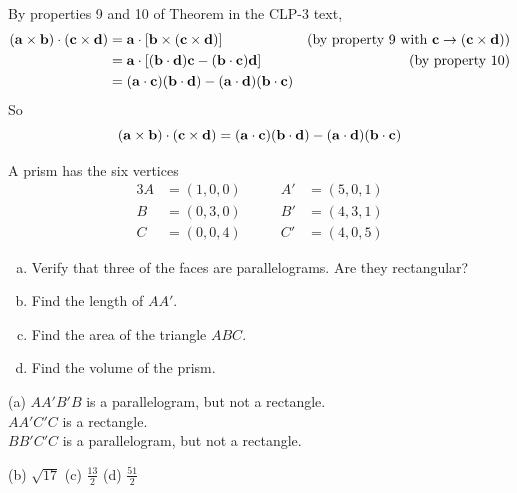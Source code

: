\begin{solution}
By properties 9 and 10 of Theorem  in the CLP-3 
text,
\begin{align*}
(\mathbf{a}\times\mathbf{b})\cdot(\mathbf{c}\times\mathbf{d})
&=\mathbf{a}\cdot[\mathbf{b}\times(\mathbf{c}\times\mathbf{d})]
\hskip.5in&\text{(by property 9 with $\mathbf{c}\rightarrow (\mathbf{c}\times\mathbf{d})$)} \\
&=\mathbf{a}\cdot[(\mathbf{b}\cdot\mathbf{d})\mathbf{c}-(\mathbf{b}\cdot\mathbf{c})\mathbf{d}]
\hskip.25in&\text{(by property 10)}\cr
&=(\mathbf{a}\cdot\mathbf{c})(\mathbf{b}\cdot\mathbf{d})
-(\mathbf{a}\cdot\mathbf{d})(\mathbf{b}\cdot\mathbf{c})
\end{align*}
So
\begin{equation*}
(\mathbf{a}\times\mathbf{b})\cdot(\mathbf{c}\times\mathbf{d})=
(\mathbf{a}\cdot\mathbf{c})(\mathbf{b}\cdot\mathbf{d})
-(\mathbf{a}\cdot\mathbf{d})(\mathbf{b}\cdot\mathbf{c})
\end{equation*}
\end{solution}


\begin{question}
A prism has the six vertices
\begin{alignat*}{3}
A&=(1,0,0)\qquad   &  A'&=(5,0,1) \\
B&=(0,3,0)   &  B'&=(4,3,1) \\
C&=(0,0,4)   &  C'&=(4,0,5) 
\end{alignat*}
\begin{enumerate}[(a)]
\item
  Verify that three of the faces are parallelograms.
  Are they rectangular?
\item
  Find the length of $AA'$.
\item
  Find the area of the triangle $ABC$.
\item
   Find the volume of the prism.
\end{enumerate}
\end{question}


\begin{answer}
(a)
$AA'B'B$ is a parallelogram, but not a rectangle.\\
$AA'C'C$ is a rectangle.\\
$BB'C'C$ is a parallelogram, but not a rectangle.

(b) $\sqrt{17}$ \qquad
(c) $\frac{13}{2}$\qquad
(d) $\frac{51}{2}$


\end{answer}

